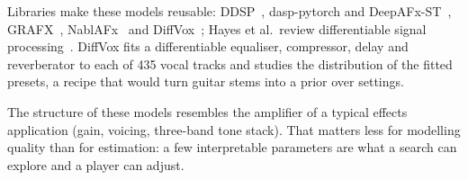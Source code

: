 Libraries make these models reusable: DDSP~\cite{engel2020ddsp},
dasp-pytorch and DeepAFx-ST~\cite{steinmetz2022style}, GRAFX~\cite{lee2024grafx},
NablAFx~\cite{comunita2025nablafx} and DiffVox~\cite{yu2025diffvox}; Hayes et
al.\ review differentiable signal processing~\cite{hayes2024review}. DiffVox
fits a differentiable equaliser, compressor, delay and reverberator to each of
435 vocal tracks and studies the distribution of the fitted presets, a recipe
that would turn guitar stems into a prior over settings.

The structure of these models resembles the amplifier of a typical effects
application (gain, voicing, three-band tone stack). That matters less for
modelling quality than for estimation: a few interpretable parameters are
what a search can explore and a player can adjust.
